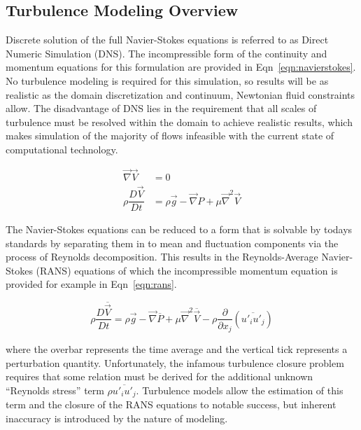 \documentclass[journal]{new-aiaa}
\begin{document}
\subsection{Turbulence Modeling Overview} \label{subsec:turbulencemodeling}

 Discrete solution of the full Navier-Stokes equations is referred to as Direct Numeric Simulation (DNS). The incompressible form of the continuity and momentum equations for this formulation are provided in Eqn~\ref{eqn:navierstokes}. No turbulence modeling is required for this simulation, so results will be as realistic as the domain discretization and continuum, Newtonian fluid constraints allow. The disadvantage of DNS lies in the requirement that all scales of turbulence must be resolved within the domain to achieve realistic results, which makes simulation of the majority of flows infeasible with the current state of computational technology.

\begin{equation}
\label{eqn:navierstokes}
\begin{split}
\vec{\nabla}\vec{V} &= 0 \\
\rho \dfrac{D \vec{V}}{D t}
    &= \rho\vec{g} - \vec{\nabla} P + \mu \vec{\nabla}^2 \vec{V}
\end{split}
\end{equation}

The Navier-Stokes equations can be reduced to a form that is solvable by todays standards by separating them in to mean and fluctuation components via the process of Reynolds decomposition. This results in the Reynolds-Average Navier-Stokes (RANS) equations of which the incompressible momentum equation is provided for example in Eqn~\ref{eqn:rans}.



\begin{equation}
\label{eqn:rans}
\rho \dfrac{D \overline{\vec{V}}}{D t}
    = \rho\vec{g} - \vec{\nabla} \overline{P}
    + \mu \vec{\nabla}^2 \overline{\vec{V}}
    - \rho \dfrac{\partial}{\partial x_j} \left( \overline{u'_i u'_j} \right)
\end{equation}

\noindent where the overbar represents the time average and the vertical tick represents a perturbation quantity. Unfortunately, the infamous turbulence closure problem requires that some relation must be derived for the additional unknown ``Reynolds stress'' term $\rho \overline{u'_i u'_j}$. Turbulence models allow the estimation of this term and the closure of the RANS equations to notable success, but inherent inaccuracy is introduced by the nature of modeling.
\end{document}
